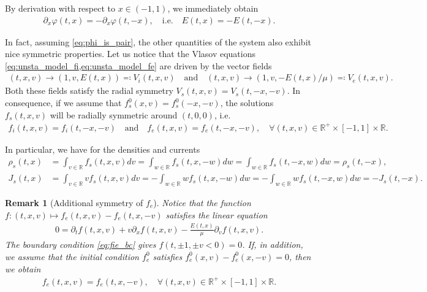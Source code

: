 \documentclass{article}
\newtheorem{remarque}{Remark}[section]
\numberwithin{equation}{section}
\newcommand{\R}{\mathbb{R}}
\newcommand{\vv}[1]{\begin{pmatrix} #1 \end{pmatrix}} %
\begin{document}
By derivation with respect to $x \in (-1,1)$, we immediately obtain 
\begin{align*}
	\partial_x \varphi(t,x) = - \partial_x \varphi (t,-x), \quad \text{i.e.} \quad E(t,x) = - E(t,-x).
\end{align*}
 
In fact, assuming \cref{eq:phi_is_pair}, the other quantities of the system also exhibit nice symmetric properties. Let us notice that the Vlasov equations \cref{eq:unsta_model_fi,eq:unsta_model_fe} are driven by the vector fields
\begin{align*}
	(t,x,v) \to (1, v, E(t,x)) \eqqcolon V_i(t,x,v) \quad \text{and} \quad (t,x,v) \to (1, v, -E(t,x)/\mu) \eqqcolon V_e(t,x,v).
\end{align*}
 Both these fields satisfy the radial symmetry $V_s(t,x,v) = V_s(t,-x,-v)$. In consequence, if we assume that $f_s^0(x,v)=f_s^0(-x,-v)$, the solutions $f_s(t,x,v)$ will be radially symmetric around $(t,0,0)$, i.e. 
 \begin{align*}
 	f_i(t,x,v) = f_i(t,-x,-v) \quad \text{and} \quad f_e(t,x,v) = f_e(t,-x,-v), \quad \forall (t,x,v) \in \R^+ \times [-1,1] \times \mathbb{R}.
 \end{align*}

 In particular, we have for the densities and currents 
 \begin{align*}
 	\rho_s (t,x) &= \int_{v\in\mathbb{R}} f_s (t,x,v) dv =  \int_{w\in\mathbb{R}} f_s (t,x,-w) dw = \int_{w\in\mathbb{R}} f_s (t,-x,w) dw = \rho_s (t,-x),  \\ %
 	J_s (t,x) &= \int_{v\in\mathbb{R}} v f_s (t,x,v) dv =  - \int_{w\in\mathbb{R}} w f_s (t,x,-w) dw = - \int_{w\in\mathbb{R}} w f_s (t,-x,w) dw = - J_s (t,-x).
 \end{align*}
 
 \begin{remarque}[Additional symmetry of $f_e$] Notice that the function $f : (t,x,v) \mapsto f_e(t,x,v) - f_e(t,x,-v)$ satisfies the linear equation 
 	 \begin{align*}
 	 	0 = \partial_t f (t,x,v) + v \partial_x f (t,x,v) - \frac{E(t,x)}{\mu} \partial_v f (t,x,v). %
 	 \end{align*}
 	 The boundary condition \cref{eq:fie_bc} gives $f(t,\pm 1, \pm v < 0) = 0$. If, in addition, we assume that the initial condition $f_e^0$ satisfies $f_e^0(x,v) - f_e^0(x,-v) = 0$, then we obtain 
 	 \begin{align}\label{eq:fe_sym_v}
 	 	f_e(t,x,v) = f_e(t,x,-v), \quad \forall (t,x,v) \in \R^+ \times [-1,1] \times \mathbb{R}.
 	 \end{align}
 \end{remarque}
 
\end{document}
